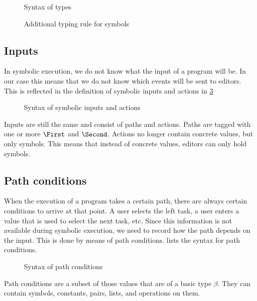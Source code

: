 \begin{figure}[h]
  \small
  \caption{Syntax of \TOPHAT types}
  \label{fig:syntaxtypes}
\end{figure}

\begin{figure}[h]
  \small
  \caption{Additional typing rule for symbols}
  \label{fig:typingsymbol}
\end{figure}



\subsection{Inputs}

In symbolic execution, we do not know what the input of a program will be.
In our case this means that we do not know which events will be sent to editors.
This is reflected in the definition of symbolic inputs and actions in \cref{fig:syntaxinputs}

\begin{figure}[h]
  \small
  \caption{Syntax of symbolic inputs and actions}
  \label{fig:syntaxinputs}
\end{figure}

Inputs are still the same and consist of paths and actions.
Paths are tagged with one or more $\First$ and $\Second$.
Actions no longer contain concrete values, but only symbols.
This means that instead of concrete values, editors can only hold symbols.



\subsection{Path conditions}

When the execution of a \TOPHAT program takes a certain path, there are always certain conditions to arrive at that point.
A user selects the left task, a user enters a value that is used to select the next task, etc.
Since this information is not available during symbolic execution, we need to record how the path depends on the input.
This is done by means of path conditions.
 lists the syntax for path conditions.

\begin{figure}[h]
  \small
  \caption{Syntax of path conditions}
  \label{fig:syntaxpredicates}
\end{figure}

Path conditions are a subset of those values that are of a basic type $\beta$.
They can contain symbols, constants, pairs, lists, and operations on them.
